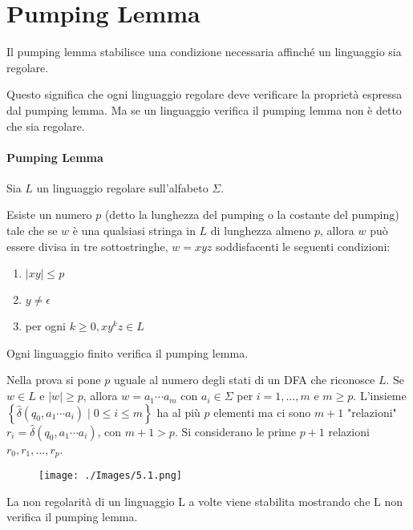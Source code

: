 \chapter{Pumping Lemma}

Il pumping lemma stabilisce una condizione necessaria affinché
un linguaggio sia regolare.

Questo significa che ogni linguaggio regolare deve verificare la
proprietà espressa dal pumping lemma.
Ma se un linguaggio verifica il pumping lemma non è detto
che sia regolare.

\subsubsection{Pumping Lemma}

Sia $L$ un linguaggio regolare sull'alfabeto $\Sigma$. 

Esiste un numero $p$ (detto la lunghezza del pumping o la costante del pumping) tale che se $w$ è una qualsiasi stringa in $L$ di lunghezza almeno $p$, allora $w$ può essere divisa in tre sottostringhe, $w=x y z$ soddisfacenti le seguenti condizioni:
\begin{enumerate}
    \item $|x y| \leq p$
    \item $y \neq \epsilon$
    \item per ogni $k \geq 0, x y^{k} z \in L$
\end{enumerate}

Ogni linguaggio finito verifica il pumping lemma.

Nella prova si pone $p$ uguale al numero degli stati di un DFA che riconosce $L$.
Se $w \in L$ e $|w| \geq p$, allora $w=a_{1} \cdots a_{m}$ con $a_{i} \in \Sigma$ per $i=1, \ldots, m$ e $m \geq p$.
L'insieme $\left\{\hat{\delta}\left(q_{0}, a_{1} \cdots a_{i}\right) \mid 0 \leq i \leq m\right\}$ ha al più $p$ elementi ma ci sono $m+1$ "relazioni" $r_{i}=\hat{\delta}\left(q_{0}, a_{1} \cdots a_{i}\right)$, con $m+1>p$. Si considerano le prime $p+1$ relazioni $r_{0}, r_{1}, \ldots, r_{p}$.

\begin{figure}[hbpt!]
    \centering
    \texttt{[image: ./Images/5.1.png]}
\end{figure}
\FloatBarrier

La non regolarità di un linguaggio L a volte
viene stabilita mostrando che L non verifica il pumping lemma.

\vspace{5mm}

